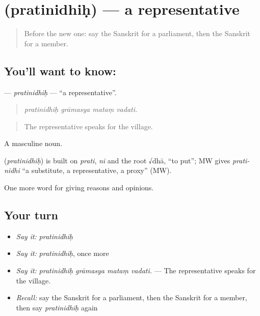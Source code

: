 \section[\texorpdfstring{\sk{प्रतिनिधिः} (pratinidhiḥ)}{प्रतिनिधिः (pratinidhiḥ)}]{ (pratinidhiḥ) — a representative}

\label{lesson:SA-C355-pratinidhih}



\begin{quote}
Before the new one: say the Sanskrit for a parliament, then the Sanskrit for a member.
\end{quote}

\subsection*{You'll want to know: }
\textbf{} — \emph{pratinidhiḥ} — \textquotedblleft{}a representative\textquotedblright{}.

\begin{quote}
   
\end{quote}

\begin{quote}
\emph{pratinidhiḥ grāmasya mataṃ vadati.}
\end{quote}

\begin{quote}
The representative speaks for the village.
\end{quote}

A masculine noun.

\begin{cousinweb}
\textbf{} (\emph{pratinidhiḥ}) is built on \emph{prati}, \emph{ni} and the root √dhā, \textquotedblleft{}to put\textquotedblright{}; MW gives \emph{prati-nidhi} \textquotedblleft{}a substitute, a representative, a proxy\textquotedblright{} (MW).
\end{cousinweb}

\begin{grammarlens}[title={What you've built}]
One more word for giving reasons and opinions.
\end{grammarlens}

\subsection*{Your turn}
\begin{itemize}
\raggedright
  \item \emph{Say it:} \emph{pratinidhiḥ}
  \item \emph{Say it:} \emph{pratinidhiḥ}, once more
  \item \emph{Say it:} \emph{pratinidhiḥ grāmasya mataṃ vadati.} — The representative speaks for the village.
  \item \emph{Recall:} say the Sanskrit for a parliament, then the Sanskrit for a member, then say \emph{pratinidhiḥ} again
\end{itemize}

